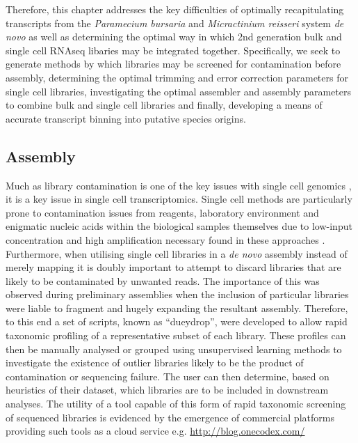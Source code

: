 


Therefore, this chapter addresses the key difficulties of optimally recapitulating transcripts from the \textit{Paramecium bursaria}
and \textit{Micractinium reisseri} system \textit{de novo} as well as 
determining the optimal way in which 2nd generation bulk and single cell RNAseq libaries may be integrated together.
Specifically, we seek to generate methods by which libraries may be screened for contamination before assembly, 
determining the optimal trimming and error correction parameters for single cell libraries, investigating the optimal
assembler and assembly parameters to combine bulk and single cell libraries and finally,
developing a means of accurate transcript binning into putative species origins.


\subsection{Assembly}

Much as library contamination is one of the key issues with single cell genomics \citep{Blainey2013,Lusk2014}, it is a key
issue in single cell transcriptomics.  Single cell methods are particularly prone to contamination issues
from reagents, laboratory environment and enigmatic nucleic acids within the biological samples themselves due to 
low-input concentration and high amplification necessary found in these approaches \citep{Blainey2013}.
Furthermore, when utilising single cell libraries in a \textit{de novo} assembly instead of merely mapping
it is doubly important to attempt to discard libraries that are likely to be contaminated by unwanted
reads.  The importance of this was observed during preliminary assemblies when the inclusion of particular
libraries were liable to fragment and hugely expanding the resultant assembly.  
Therefore, to this end a set of scripts, known as ``dueydrop'', were developed to allow rapid taxonomic profiling of a
representative subset of each library.  These profiles can then be manually analysed or grouped using unsupervised learning methods 
to investigate the existence of outlier libraries likely to be the product of contamination or sequencing failure.
The user can then determine, based on heuristics of their dataset, which libraries are to be included in downstream analyses.
The utility of a tool capable of this form of rapid taxonomic screening of sequenced libraries is evidenced
by the emergence of commercial platforms providing such tools as a cloud service e.g. \url{http://blog.onecodex.com/}



